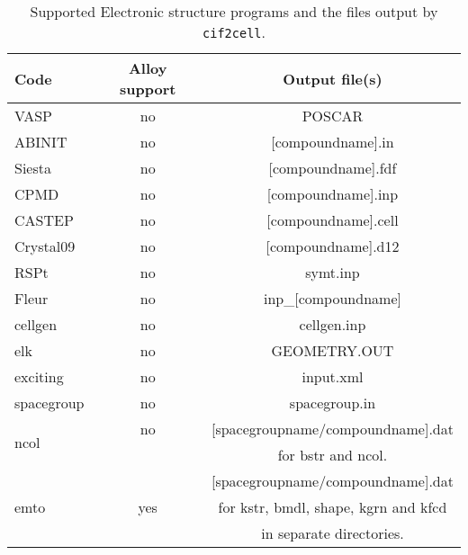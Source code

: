 \documentclass[11pt]{article}
\newcommand{\ciftocell}{\texttt{cif2cell}}
\begin{document}
\begin{table}[htdp]
\caption{Supported Electronic structure programs and the files output by \ciftocell.}
\begin{center}
\begin{tabular}{l|c|c}
Code  & Alloy support & Output file(s)\\ \hline
VASP & no  &POSCAR \\
ABINIT & no & [compoundname].in\\
Siesta & no & [compoundname].fdf\\
CPMD & no & [compoundname].inp\\
CASTEP & no & [compoundname].cell\\
Crystal09 & no & [compoundname].d12\\
RSPt & no & symt.inp\\
Fleur & no & inp\_[compoundname]\\
cellgen & no & cellgen.inp\\
elk & no & GEOMETRY.OUT\\
exciting & no & input.xml\\
spacegroup & no & spacegroup.in\\
\multirow{2}{*}{ncol} & no & [spacegroupname/compoundname].dat \\
 &  &  for bstr and ncol. \\
\multirow{3}{*}{emto} & & [spacegroupname/compoundname].dat \\ 
 & yes & for kstr, bmdl, shape, kgrn and kfcd \\
 &  & in separate directories.
\end{tabular}
\end{center}
\label{default}
\end{table}%
\end{document}
